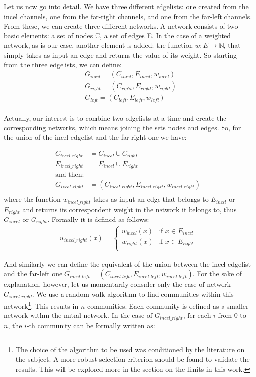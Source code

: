 \documentclass[a4paper,twoside,12pt, openany]{book}
\begin{document}
Let us now go into detail. We have three different edgelists: one created from the incel channels, one from the far-right channels, and one from the far-left channels. From these, we can create three different networks. A network consists of two basic elements: a set of nodes C, a set of edges E. In the case of a weighted network, as is our case, another element is added: the function $w: E \to \mathbb{N} $, that simply takes as input an edge and returns the value of its weight. So starting from the three edgelists, we can define: 
\label{eq:couple_networks}
\begin{align*}
	&G_{incel} = (C_{incel},E_{incel},w_{incel})\\
	&G_{right} = (C_{right},E_{right},w_{right})\\
	&G_{left} = (C_{left},E_{left},w_{left})\\
\end{align*}

Actually, our interest is to combine two edgelists at a time and create the corresponding networks, which means joining the sets nodes and edges. So, for the union of the incel edgelist and the far-right one we have: 

\begin{align*}
	C_{incel\_right} &= C_{incel} \cup C_{right}\\
	E_{incel\_right} &= E_{incel} \cup E_{right}\\
	\text{and then:}\\
	G_{incel\_right} &= (C_{incel\_right}, E_{incel\_right}, w_{incel\_right})\\
\end{align*}
where the function $w_{incel\_right}$ takes as input an edge that belongs to $E_{incel}$ or $E_{right}$ and returns its correspondent weight in the network it belongs to, thus $G_{incel}$ or $G_{right}$. Formally it is defined as follows:
\begin{align*}
	w_{incel\_right}(x) = 
	\begin{cases} 
		w_{incel}(x) & \text{if } x \in E_{incel} \\
		w_{right}(x) & \text{if } x \in E_{right}\\
	\end{cases}
\end{align*}

And similarly we can define the equivalent of the union between the incel edgelist and the far-left one $G_{incel\_left} = (C_{incel\_left}, E_{incel\_left},w_{incel\_left})$. For the sake of explanation, however, let us momentarily consider only the case of network $G_{incel\_right}$. We use a random walk algorithm to find communities within this network\footnote{The choice of the algorithm to be used was conditioned by the literature on the subject. A more robust selection criterion should be found to validate the results. This will be explored more in the section on the limits in this work.}. This results in $n$ communities. Each community is defined as a smaller network within the initial network. In the case of $G_{incel\_right}$, for each $i$ from 0 to $n$, the $i$-th community can be formally written as: 
\end{document}

